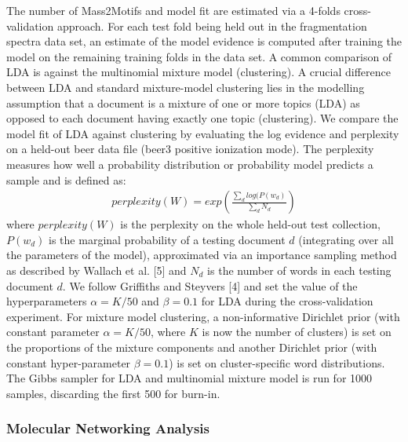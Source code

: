 The number of Mass2Motifs and model fit are estimated via a 4-folds cross-validation approach. For each test fold being held out in the fragmentation spectra data set, an estimate of the model evidence is computed after training the model on the remaining training folds in the data set. A common comparison of LDA is against the multinomial mixture model (clustering). A crucial difference between LDA and standard mixture-model clustering lies in the modelling assumption that a document is a mixture of one or more topics (LDA) as opposed to each document having exactly one topic (clustering). We compare the model fit of LDA against clustering by evaluating the log evidence and perplexity on a held-out beer data file (beer3 positive ionization mode). The perplexity measures how well a probability distribution or probability model predicts a sample and is defined as:
\begin{align*}
perplexity(W)=exp(\frac{\sum_{d}log(P(w_{d})}{\sum_{d}N_d})
\end{align*}
where $perplexity(W)$ is the perplexity on the whole held-out test collection, $P(w_d)$ is the marginal probability of a testing document $d$ (integrating over all the parameters of the model), approximated via an importance sampling method as described by Wallach et al. [5] and $N_d$ is the number of words in each testing document $d$. We follow Griffiths and Steyvers [4] and set the value of the hyperparameters $\alpha=K/50$ and $\beta=0.1$ for LDA during the cross-validation experiment. For mixture model clustering, a non-informative Dirichlet prior (with constant parameter $\alpha=K/50$, where $K$ is now the number of clusters) is set on the proportions of the mixture components and another Dirichlet prior (with constant hyper-parameter $\beta=0.1$) is set on cluster-specific word distributions. The Gibbs sampler for LDA and multinomial mixture model is run for 1000 samples, discarding the first 500 for burn-in.

\subsubsection{Molecular Networking Analysis}

